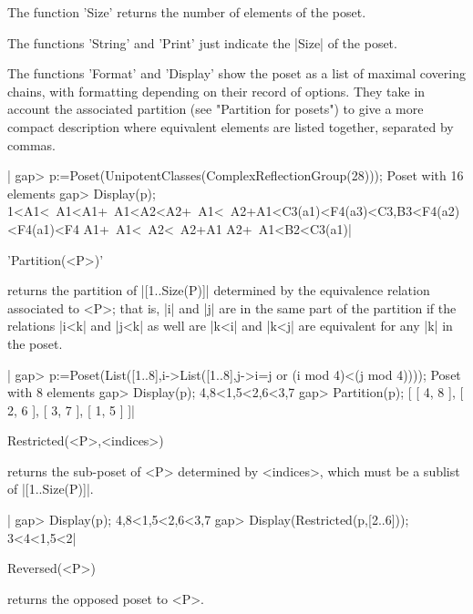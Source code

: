 %

The function 'Size' returns the number of elements of the poset.

The functions 'String' and 'Print' just indicate the |Size| of the poset.

The  functions 'Format' and 'Display'  show the poset as  a list of maximal
covering chains, with formatting depending on their record of options. They
take  in account the  associated partition (see  "Partition for posets") to
give  a  more  compact  description  where  equivalent  elements are listed
together, separated by commas.

|    gap> p:=Poset(UnipotentClasses(ComplexReflectionGroup(28)));
    Poset with 16 elements
    gap> Display(p);
    1<A1<~A1<A1+~A1<A2<A2+~A1<~A2+A1<C3(a1)<F4(a3)<C3,B3<F4(a2)<F4(a1)<F4
    A1+~A1<~A2<~A2+A1
    A2+~A1<B2<C3(a1)|

%
%

'Partition(<P>)'

returns  the  partition  of  |[1..Size(P)]|  determined  by the equivalence
relation  associated to <P>; that  is, |i| and |j|  are in the same part of
the  partition if the relations |i<k| and |j<k| as well are |k<i| and |k<j|
are equivalent for any |k| in the poset.

|    gap> p:=Poset(List([1..8],i->List([1..8],j->i=j or (i mod 4)<(j mod 4))));
    Poset with 8 elements
    gap> Display(p);
    4,8<1,5<2,6<3,7
    gap> Partition(p);
    [ [ 4, 8 ], [ 2, 6 ], [ 3, 7 ], [ 1, 5 ] ]|

%

Restricted(<P>,<indices>)

returns the sub-poset of <P> determined by <indices>, which must be a sublist
of |[1..Size(P)]|.

|    gap> Display(p);
    4,8<1,5<2,6<3,7
    gap> Display(Restricted(p,[2..6]));
    3<4<1,5<2|

%

Reversed(<P>)

returns the opposed poset to <P>.

